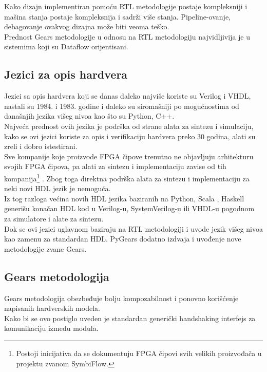 Kako dizajn implementiran pomoću RTL metodologije postaje kompleksniji i mašina
stanja postaje kompleksnija i sadrži više stanja.
Pipeline-ovanje, debagovanje  ovakvog dizajna može biti veoma teško. \\
Prednost Gears metodologije u odnosu na RTL metodologiju najvidljivija je u
sistemima koji su Dataflow orijentisani.

\subsection{Jezici za opis hardvera}

Jezici sa opis hardvera koji se danas daleko najviše koriste su Verilog i VHDL,
nastali su 1984. i 1983. godine i daleko su siromašniji po mogućnostima od današnjih
jezika višeg nivoa kao što su Python, C++. \\
Najveća prednost ovih jezika je podrška od strane alata za sintezu i simulaciju,
kako se ovi jezici koriste za opis i verifikaciju hardvera preko 30 godina,
alati su zreli i dobro istestirani. \\

Sve kompanije koje proizvode FPGA čipove trenutno ne objavljuju
arhitekturu svojih FPGA čipova, pa alati za sintezu i implementaciju zavise od
tih kompanija\footnote{Postoji inicijativa da se dokumentuju FPGA čipovi svih velikih
proizvođača u projektu zvanom SymbiFlow\cite{SymbiFlow}.}
.
Zbog toga direktna podrška alata za sintezu i implementaciju za neki novi HDL jezik je
nemoguća. \\

Iz tog razloga većina novih HDL jezika baziranih na
Python\cite{decaluwe2004myhdl, PyGears_OSDA}, Scala
\cite{bachrach2012chisel, SpinalHDL}, Haskell\cite{baaij2010c} generišu konačan
HDL kod u Verilog-u, SystemVerilog-u ili VHDL-u pogodnom za simulatore i alate
za sintezu. \\

Dok se ovi jezici uglavnom baziraju na RTL metodologiji i uvode jezik višeg
nivoa kao zamenu za standardan HDL.
PyGears dodatno izdvaja i uvođenje nove metodologije zvane Gears.

\subsection{Gears metodologija}
Gears metodologija obezbeđuje bolju kompozabilnost i ponovno korišćenje
napisanih hardverskih modela. \\
Kako bi se ovo postiglo uveden je standardan generički handshaking interfejs za
komunikaciju između modula.

